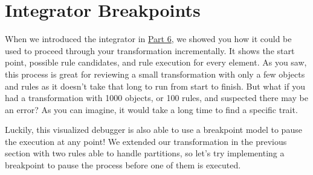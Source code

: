 \newpage
\hypertarget{sec:breakpoints}{}
\section{Integrator Breakpoints}
\genHeader

When we introduced the integrator in \hyperlink{sec:app_integrator}{Part 6}, we showed you how it could be used to proceed through your transformation
incrementally. It shows the start point, possible rule candidates, and rule execution for every element. As you saw, this process
is great for reviewing a small transformation with only a few objects and rules as it doesn't take that long to run from start to finish. But what if you had a
transformation with 1000 objects, or 100 rules, and suspected there may be an error? As you can imagine, it would take a long time to find a specific trait.

Luckily, this visualized debugger is also able to use a breakpoint model to pause the execution at any point! We extended our transformation in
the previous section with two rules able to handle partitions, so let's try implementing a breakpoint to pause the process before one of them is executed.

